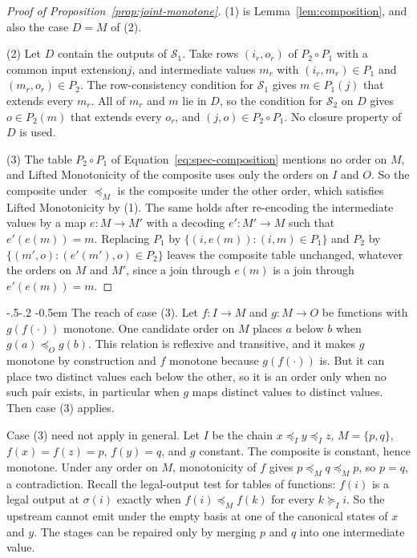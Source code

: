 \documentclass[sigconf]{cidr-2027}
\makeatletter
\theoremstyle{remark}
\renewcommand\paragraph{\@startsection{paragraph}{4}{\z@}%
  {-.5\baselineskip \@plus -2\p@ \@minus -.2\p@}%
  {-0.5em}%
  {\normalfont\bfseries}}
\newcommand{\InputOrd}{\preceq_I}
\newcommand{\OutputOrd}{\preceq_O}
\newcommand{\InputGe}{\succeq_I}
\newcommand{\indesc}{input extension\xspace} %
\newcommand{\outrel}{extends\xspace}          %
\newcommand{\Spec}{\mathcal{S}}
\makeatother
\begin{document}
\begin{proof}[Proof of Proposition~\ref{prop:joint-monotone}]
(1) is Lemma~\ref{lem:composition}, and also the case $D=M$ of (2).

(2) Let $D$ contain the outputs of $\Spec_1$. Take rows $(i_r,o_r)$ of $P_2\circ
P_1$ with a common \indesc $j$, and intermediate values $m_r$ with
$(i_r,m_r)\in P_1$ and $(m_r,o_r)\in P_2$. The row-consistency condition for
$\Spec_1$ gives $m\in P_1(j)$ that \outrel every $m_r$. All of $m_r$ and $m$
lie in $D$, so the condition for $\Spec_2$ on $D$ gives $o\in P_2(m)$ that
\outrel every $o_r$, and $(j,o)\in P_2\circ P_1$. No closure property of $D$
is used.

(3) The table $P_2\circ P_1$ of Equation~\ref{eq:spec-composition} mentions
no order on $M$, and Lifted Monotonicity of the composite uses only the
orders on $I$ and $O$. So the composite under $\preceq_M$ is the composite
under the other order, which satisfies Lifted Monotonicity by (1). The same
holds after re-encoding the intermediate values by a map $e:M\to M'$ with a
decoding $e':M'\to M$ such that $e'(e(m))=m$. Replacing $P_1$ by
$\{(i,e(m)):(i,m)\in P_1\}$ and $P_2$ by $\{(m',o):(e'(m'),o)\in P_2\}$
leaves the composite table unchanged, whatever the orders on $M$ and $M'$,
since a join through $e(m)$ is a join through $e'(e(m))=m$.
\end{proof}

\paragraph{The reach of case (3).}
Let $f:I\to M$ and $g:M\to O$ be
functions with $g(f(\cdot))$ monotone. One candidate order on $M$ places $a$
below $b$ when $g(a)\OutputOrd g(b)$. This relation is reflexive and
transitive, and it makes $g$ monotone by construction and $f$ monotone
because $g(f(\cdot))$ is. But it can place two distinct values each below
the other, so it is an order only when no such pair exists, in particular
when $g$ maps distinct values to distinct values. Then case (3) applies.

Case (3) need not apply in general. Let $I$ be the chain $x\InputOrd
y\InputOrd z$, $M=\{p,q\}$, $f(x)=f(z)=p$, $f(y)=q$, and $g$ constant. The
composite is constant, hence monotone. Under any order on $M$, monotonicity
of $f$ gives $p\preceq_M q\preceq_M p$, so $p=q$, a contradiction. Recall the
legal-output test for tables of functions: $f(i)$ is a legal output at
$\sigma(i)$ exactly when $f(i)\preceq_M f(k)$ for every $k\InputGe i$. So the
upstream cannot emit under the empty basis at one of the canonical states of
$x$ and $y$. The stages can be repaired only by merging $p$ and $q$ into one
intermediate value.
\end{document}

